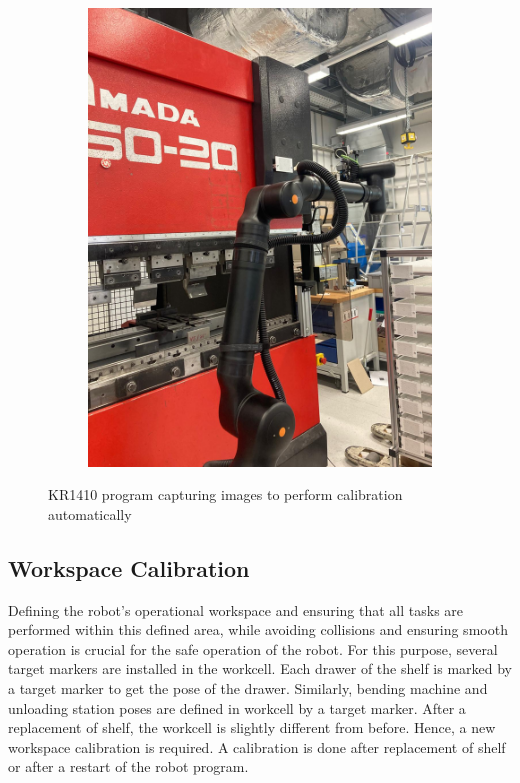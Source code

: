 \begin{figure}[h]
\begin{subfigure}{0.48\textwidth}
        \includegraphics[width=\textwidth, angle=0]{figures/001calibration/calibration-process-right.jpeg} %
        \label{fig:calibration-process-right}
    \end{subfigure}
    \caption{KR1410 program capturing images to perform calibration automatically}
    \label{fig:auto-calibration-process}
\end{figure}

\FloatBarrier
\subsection{Workspace Calibration}
\label{subsec:workspace-calibration}
Defining the robot's operational workspace and ensuring that all tasks are performed within this defined area, while avoiding collisions and ensuring smooth operation is crucial for the safe operation of the robot. For this purpose, several target markers are installed in the workcell. Each drawer of the shelf is marked by a target marker to get the pose of the drawer. Similarly, bending machine and unloading station poses are defined in workcell by a target marker. After a replacement of shelf, the workcell is slightly different from before. Hence, a new workspace calibration is required. A calibration is done after replacement of shelf or after a restart of the robot program.



